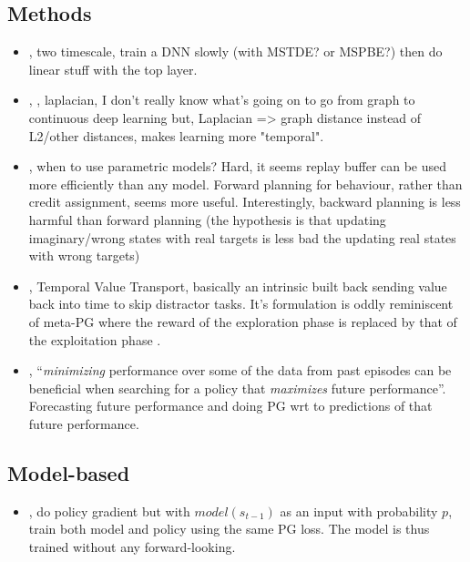 \subsection{Methods}
\begin{itemize}
  \item \citet{chung2018twotimescale}, two timescale, train a DNN slowly (with MSTDE? or MSPBE?) then do linear stuff with the top layer.
  \item \citet{wu2018the}, \citet{machado2017laplacian}, laplacian, I don't really know what's going on to go from graph to continuous deep learning but, Laplacian => graph distance instead of L2/other distances, makes learning more "temporal". 
  \item \citet{hasselt2019use}, when to use parametric models? Hard, it seems replay buffer can be used more efficiently than any model.  Forward planning for behaviour, rather than credit assignment, seems more useful. Interestingly, backward planning is less harmful than forward planning (the hypothesis is that updating imaginary/wrong states with real targets is less bad the updating real states with wrong targets)
  \item \citet{hung2019optimizing}, Temporal Value Transport, basically an intrinsic built back sending value back into time to skip distractor tasks. It's formulation is oddly reminiscent of meta-PG where the reward of the exploration phase is replaced by that of the exploitation phase \cite{gupta2018metareinforcement}.
  \item \citet{chandak2020optimizing}, ``\emph{minimizing} performance over some of the data from past episodes can be beneficial when searching for a policy that \emph{maximizes} future performance''. Forecasting future performance and doing PG wrt to predictions of that future performance.
\end{itemize}

\subsection{Model-based}

\begin{itemize}
    \item \citet{freeman2019learning}, do policy gradient but with $model(s_{t-1})$ as an input with probability $p$, train both model and policy using the same PG loss. The model is thus trained without any forward-looking.
    \end{itemize}

